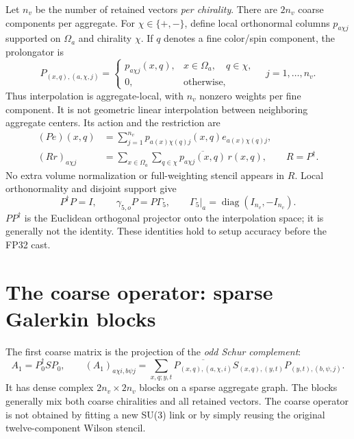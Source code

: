 \documentclass[11pt]{article}
\newcommand{\adj}{^{\dagger}}
\begin{document}
Let $n_v$ be the number of retained vectors \emph{per chirality}. There are
$2n_v$ coarse components per aggregate. For $\chi\in\{+,-\}$, define local
orthonormal columns $p_{a\chi j}$ supported on $\Omega_a$ and chirality $\chi$.
If $q$ denotes a fine color/spin component, the prolongator is
\begin{equation}
 P_{(x,q),(a,\chi,j)}=
 \begin{cases}
 p_{a\chi j}(x,q),&x\in\Omega_a,\quad q\in\chi,\\
 0,&\text{otherwise},
 \end{cases}
 \quad j=1,\ldots,n_v.
 \label{eq:P}
\end{equation}
Thus interpolation is aggregate-local, with $n_v$ nonzero weights per fine
component. It is not geometric linear interpolation between neighboring
aggregate centers. Its action and the restriction are
\begin{align}
 (Pe)(x,q)&=\sum_{j=1}^{n_v}p_{a(x)\chi(q)j}(x,q)e_{a(x)\chi(q)j},\\
 (Rr)_{a\chi j}&=\sum_{x\in\Omega_a}\sum_{q\in\chi}
       \overline{p_{a\chi j}(x,q)}\,r(x,q),\qquad R=P\adj.
 \label{eq:R}
\end{align}
No extra volume normalization or full-weighting stencil appears in $R$.
Local orthonormality and disjoint support give
\begin{equation}
 P\adj P=I,\qquad \gamma_{5,o}P=P\Gamma_5,\qquad
 \Gamma_5\big|_a=\operatorname{diag}(I_{n_v},-I_{n_v}).
\end{equation}
$PP\adj$ is the Euclidean orthogonal projector onto the interpolation space;
it is generally not the identity. These identities hold to setup accuracy
before the FP32 cast.

\section{The coarse operator: sparse Galerkin blocks}
The first coarse matrix is the projection of the \emph{odd Schur complement}:
\begin{equation}
 A_1=P_0\adj S P_0,\qquad
 (A_1)_{a\chi i,b\psi j}
 =\sum_{x,q;y,t}\overline{P_{(x,q),(a,\chi,i)}}
 S_{(x,q),(y,t)}P_{(y,t),(b,\psi,j)}.
 \label{eq:galerkin}
\end{equation}
It has dense complex $2n_v\times2n_v$ blocks on a sparse aggregate graph.
The blocks generally mix both coarse chiralities and all retained vectors.
The coarse operator is not obtained by fitting a new SU(3) link or by simply
reusing the original twelve-component Wilson stencil.
\end{document}
